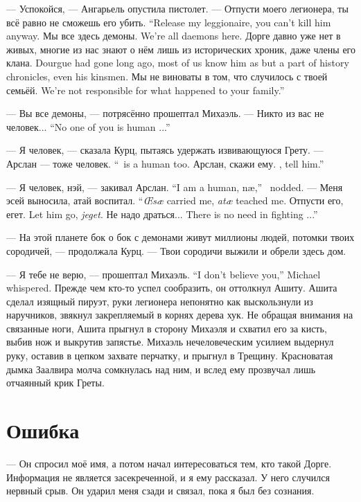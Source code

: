 --- Успокойся, --- Ангарьель опустила пистолет.
{--- Отпусти моего легионера, ты всё равно не сможешь его убить.}
{``Release my leggionaire, you can't kill him anyway.}
{Мы все здесь демоны.}
{We're all daemons here.}
{Дорге давно уже нет в живых, многие из нас знают о нём лишь из исторических хроник, даже члены его клана.}
{Dourgue had gone long ago, most of us know him as but a part of history chronicles, even his kinsmen.}
{Мы не виноваты в том, что случилось с твоей семьёй.}
{We're not responsible for what happened to your family.''}

--- Вы все демоны, --- потрясённо прошептал Михаэль.
{--- Никто из вас не человек...}
{``No one of you is human ...''}

--- Я человек, --- сказала Курц, пытаясь удержать извивающуюся Грету.
{--- Арслан --- тоже человек.}
{``\Arythlan\ is a human too.}
{Арслан, скажи ему.}
{\Arythlan, tell him.''}

{--- Я человек, нэй, --- закивал Арслан.}
{``I am a human, n\ae{},'' \Arythlan\ nodded.}
{--- Меня эсей выносила, атай воспитал.}
{``\textit{\OE{}s\ae{}} carried me, \textit{at\ae{}} teached me.}
{Отпусти его, егет.}
{Let him go, \textit{jeget}.}
{Не надо драться...}
{There is no need in fighting ...''}

--- На этой планете бок о бок с демонами живут миллионы людей, потомки твоих сородичей, --- продолжала Курц.
--- Твои сородичи выжили и обрели здесь дом.

{--- Я тебе не верю, --- прошептал Михаэль.}
{``I don't believe you,'' Michael whispered.}
Прежде чем кто-то успел сообразить, он оттолкнул Ашиту.
Ашита сделал изящный пируэт, руки легионера непонятно как выскользнули из наручников, звякнул закрепляемый в корнях дерева хук.
Не обращая внимания на связанные ноги, Ашита прыгнул в сторону Михаэля и схватил его за кисть, выбив нож и выкрутив запястье.
Михаэль нечеловеческим усилием выдернул руку, оставив в цепком захвате перчатку, и прыгнул в Трещину.
Красноватая дымка Заалвира молча сомкнулась над ним, и вслед ему прозвучал лишь отчаянный крик Греты.

\section{Ошибка}

--- Он спросил моё имя, а потом начал интересоваться тем, кто такой Дорге.
Информация не является засекреченной, и я ему рассказал.
У него случился нервный срыв.
Он ударил меня сзади и связал, пока я был без сознания.

